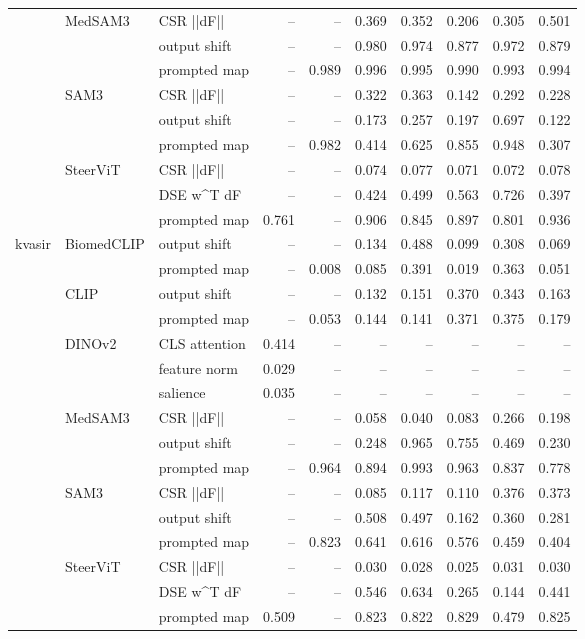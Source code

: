 \begin{tabular}{lllrrrrrrr}
\cline{2-10}
 & \multirow[t]{3}{*}{MedSAM3} & CSR  ||dF|| & -- & -- & 0.369 & 0.352 & 0.206 & 0.305 & 0.501 \\
 &  & output shift & -- & -- & 0.980 & 0.974 & 0.877 & 0.972 & 0.879 \\
 &  & prompted map & -- & 0.989 & 0.996 & 0.995 & 0.990 & 0.993 & 0.994 \\
\cline{2-10}
 & \multirow[t]{3}{*}{SAM3} & CSR  ||dF|| & -- & -- & 0.322 & 0.363 & 0.142 & 0.292 & 0.228 \\
 &  & output shift & -- & -- & 0.173 & 0.257 & 0.197 & 0.697 & 0.122 \\
 &  & prompted map & -- & 0.982 & 0.414 & 0.625 & 0.855 & 0.948 & 0.307 \\
\cline{2-10}
 & \multirow[t]{3}{*}{SteerViT} & CSR  ||dF|| & -- & -- & 0.074 & 0.077 & 0.071 & 0.072 & 0.078 \\
 &  & DSE  w^T dF & -- & -- & 0.424 & 0.499 & 0.563 & 0.726 & 0.397 \\
 &  & prompted map & 0.761 & -- & 0.906 & 0.845 & 0.897 & 0.801 & 0.936 \\
\cline{1-10} \cline{2-10}
\multirow[t]{16}{*}{kvasir} & \multirow[t]{2}{*}{BiomedCLIP} & output shift & -- & -- & 0.134 & 0.488 & 0.099 & 0.308 & 0.069 \\
 &  & prompted map & -- & 0.008 & 0.085 & 0.391 & 0.019 & 0.363 & 0.051 \\
\cline{2-10}
 & \multirow[t]{2}{*}{CLIP} & output shift & -- & -- & 0.132 & 0.151 & 0.370 & 0.343 & 0.163 \\
 &  & prompted map & -- & 0.053 & 0.144 & 0.141 & 0.371 & 0.375 & 0.179 \\
\cline{2-10}
 & \multirow[t]{3}{*}{DINOv2} & CLS attention & 0.414 & -- & -- & -- & -- & -- & -- \\
 &  & feature norm & 0.029 & -- & -- & -- & -- & -- & -- \\
 &  & salience & 0.035 & -- & -- & -- & -- & -- & -- \\
\cline{2-10}
 & \multirow[t]{3}{*}{MedSAM3} & CSR  ||dF|| & -- & -- & 0.058 & 0.040 & 0.083 & 0.266 & 0.198 \\
 &  & output shift & -- & -- & 0.248 & 0.965 & 0.755 & 0.469 & 0.230 \\
 &  & prompted map & -- & 0.964 & 0.894 & 0.993 & 0.963 & 0.837 & 0.778 \\
\cline{2-10}
 & \multirow[t]{3}{*}{SAM3} & CSR  ||dF|| & -- & -- & 0.085 & 0.117 & 0.110 & 0.376 & 0.373 \\
 &  & output shift & -- & -- & 0.508 & 0.497 & 0.162 & 0.360 & 0.281 \\
 &  & prompted map & -- & 0.823 & 0.641 & 0.616 & 0.576 & 0.459 & 0.404 \\
\cline{2-10}
 & \multirow[t]{3}{*}{SteerViT} & CSR  ||dF|| & -- & -- & 0.030 & 0.028 & 0.025 & 0.031 & 0.030 \\
 &  & DSE  w^T dF & -- & -- & 0.546 & 0.634 & 0.265 & 0.144 & 0.441 \\
 &  & prompted map & 0.509 & -- & 0.823 & 0.822 & 0.829 & 0.479 & 0.825 \\
\cline{1-10} \cline{2-10}
\bottomrule
\end{tabular}
